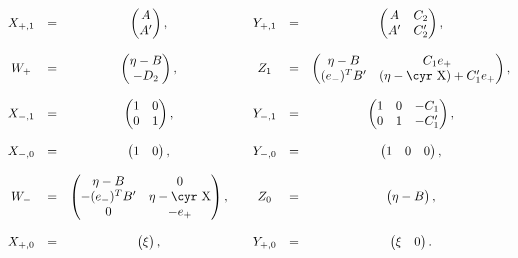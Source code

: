 \documentclass[12pt]{article}
\theoremstyle{definition}
\theoremstyle{remark}
\numberwithin{theorem}{section}
\newcommand{\Sh}{\hbox{\cyr X}}
\begin{document}
\begin{equation} 
\begin{matrix}
X_{+,1}&= & \begin{pmatrix}A\\A'\end{pmatrix},&&Y_{+,1}&=& \begin{pmatrix}A&C_2\\A'&C'_2\end{pmatrix},\\ \\
W_+&=& \begin{pmatrix}\eta-B\\-D_2\end{pmatrix},&&Z_1 &=&\begin{pmatrix}\eta-B&C_1e_+\\ (e_-)^TB'&(\eta-\Sh)+C'_1e_+\end{pmatrix},\\ \\
X_{-,1}&=& \begin{pmatrix}1&0\\0&1\end{pmatrix},&& Y_{-,1}&=& \begin{pmatrix}1&0&-C_1\\0&1&-C'_1\end{pmatrix},\\ \\
X_{-,0}&=& \begin{pmatrix}1&0\end{pmatrix},&&Y_{-,0}&=& \begin{pmatrix}1&0&0\end{pmatrix},\\ \\
W_-&=& \begin{pmatrix}\eta-B&0\\ -(e_-)^TB'&\eta-\Sh\\0&-e_+ \end{pmatrix},&&Z_0&=&\begin{pmatrix}\eta-B\end{pmatrix},\\ \\
X_{+,0}&= &\begin{pmatrix}\xi\end{pmatrix},&&Y_{+,0}&=& \begin{pmatrix}\xi&0\end{pmatrix}. 
\end{matrix}\label{matrices-caloron}
\end{equation}
\end{document}
